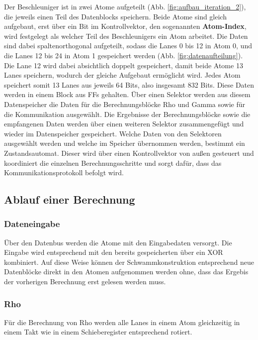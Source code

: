 Der Beschleuniger ist in zwei Atome aufgeteilt (Abb. \ref{fig:aufbau_iteration_2}), die jeweils einen Teil des Datenblocks speichern. Beide Atome sind gleich aufgebaut, erst über ein Bit im Kontrollvektor,
den sogenannten \textbf{Atom-Index}, wird festgelegt als welcher Teil des Beschleunigers ein Atom arbeitet. Die Daten sind dabei spaltenorthogonal aufgeteilt, sodass die Lanes 0 bis 12 in Atom 0,
und die Lanes 12 bis 24 in Atom 1 gespeichert werden (Abb. \ref{fig:datenaufteilung}). Die Lane 12 wird dabei absichtlich doppelt gespeichert,
damit beide Atome 13 Lanes speichern, wodurch der gleiche Aufgebaut ermöglicht wird. Jedes Atom speichert somit 13 Lanes aus jeweils 64 Bits, also insgesamt 832 Bits.
Diese Daten werden in einem Block aus FFs gehalten. Über einen Selektor werden aus diesem Datenspeicher die Daten für die Berechnungsblöcke Rho und Gamma sowie für die Kommunikation ausgewählt.
Die Ergebnisse der Berechnungsblöcke sowie die empfangenen Daten werden über einen weiteren Selektor zusammengefügt und wieder im Datenspeicher gespeichert.
Welche Daten von den Selektoren ausgewählt werden und welche im Speicher übernommen werden, bestimmt ein Zustandsautomat. Dieser wird über einen Kontrollvektor von außen gesteuert
und koordiniert die einzelnen Berechnungsschritte und sorgt dafür, dass das Kommunikationsprotokoll befolgt wird.

\subsection{Ablauf einer Berechnung}
\subsubsection{Dateneingabe}
Über den Datenbus werden die Atome mit den Eingabedaten versorgt. Die Eingabe wird entsprechend mit den bereits gespeicherten über ein XOR kombiniert.
Auf diese Weise können der Schwammkonstruktion entsprechend neue Datenblöcke direkt in den Atomen aufgenommen werden ohne,
dass das Ergebis der vorherigen Berechnung erst gelesen werden muss.
\subsubsection{Rho}
Für die Berechnung von Rho werden alle Lanes in einem Atom gleichzeitig in einem Takt wie in einem Schieberegister entsprechend rotiert.
